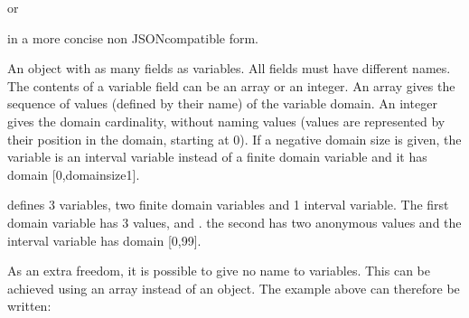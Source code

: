 \documentclass[letterpaper,10pt,openany,oneside,english]{sphinxmanual}
\begin{document}
\sphinxAtStartPar
or

\begin{sphinxVerbatim}[commandchars=\\\{\}]
 
\end{sphinxVerbatim}

\sphinxAtStartPar
in a more concise non JSON\sphinxhyphen{}compatible form.

\sphinxAtStartPar
{}

\sphinxAtStartPar
An object with as many fields as variables. All fields must have different names. The contents of a variable field can be an array or an integer. An array gives the sequence of values (defined by their name) of the variable domain. An integer gives the domain cardinality, without naming values (values are represented by their position in the domain, starting at 0). If a negative domain size is given, the variable is an interval variable instead of a finite domain variable and it has domain {[}0,\sphinxhyphen{}domainsize\sphinxhyphen{}1{]}.

\begin{sphinxVerbatim}[commandchars=\\\{\}]
  \PYG{p}{[}  \PYG{p}{]}      
\end{sphinxVerbatim}

\sphinxAtStartPar
defines 3 variables, two finite domain variables and 1 interval variable. The first domain variable has 3 values,   and . the second has two anonymous values and the interval variable has domain {[}0,99{]}.

\sphinxAtStartPar
As an extra freedom, it is possible to give no name to variables. This can be achieved using an array instead of an object. The example above can therefore be written:
\end{document}

